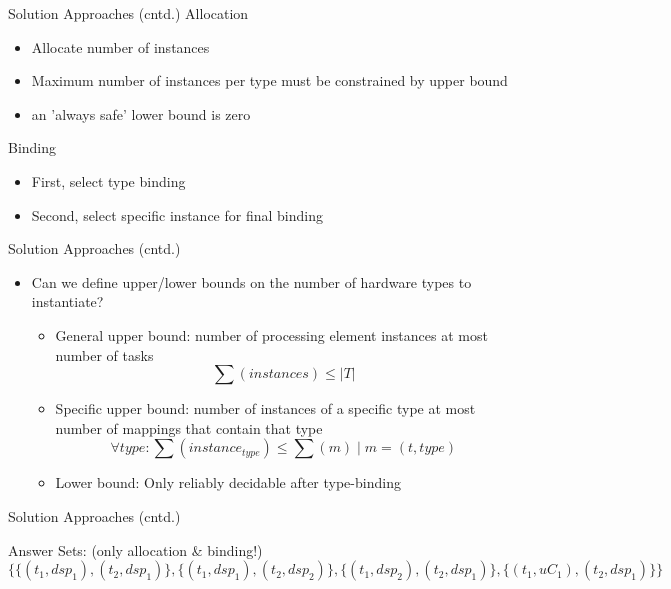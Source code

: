 \documentclass[11pt]{beamer}
\begin{document}
\begin{frame}{Solution Approaches (cntd.)}
    Allocation
  \begin{itemize} 
     \item Allocate number of instances
     \item Maximum number of instances per type must be constrained by upper bound
     \item an 'always safe' lower bound is zero
  \end{itemize}

  Binding
  \begin{itemize} 
     \item First, select type binding 
     \item Second, select specific instance for final binding
  \end{itemize}
\end{frame}

\begin{frame}{Solution Approaches (cntd.)}
  \label{slide:bounds}
  \begin{itemize} 
    \item Can we define upper/lower bounds on the number of hardware types to instantiate?
    \begin{itemize}
      \item General upper bound: number of processing element instances at most number of tasks \[\sum(instances)\leq \vert T\vert\]
      \item Specific upper bound: number of instances of a specific type at most number of mappings that contain that type \[\forall type: \sum(instance_{type}) \leq \sum(m)\mid m=(t, type)\]
      \item Lower bound: Only reliably decidable after type-binding
    \end{itemize}
  \end{itemize}
\end{frame}

\begin{frame}[fragile]{Solution Approaches (cntd.)}

  {\tiny}
   Answer Sets: (only allocation \& binding!)
  {\tiny
  \[\{\{(t_1,dsp_1),(t_2,dsp_1)\},\{(t_1,dsp_1),(t_2,dsp_2)\},\{(t_1,dsp_2),(t_2,dsp_1)\},\{(t_1,uC_1),(t_2,dsp_1)\}\}\]
  }
\end{frame}
\end{document}
